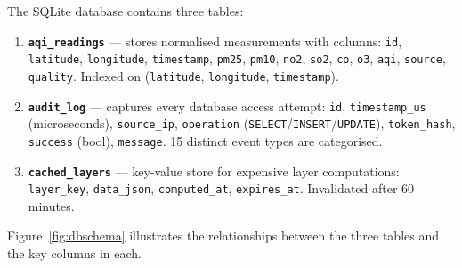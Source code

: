 \documentclass[12pt,a4paper]{article}
\begin{document}
The SQLite database contains three tables:

\begin{enumerate}
\item \textbf{\texttt{aqi\_readings}} --- stores normalised measurements with
      columns: \texttt{id}, \texttt{latitude}, \texttt{longitude},
      \texttt{timestamp}, \texttt{pm25}, \texttt{pm10}, \texttt{no2},
      \texttt{so2}, \texttt{co}, \texttt{o3}, \texttt{aqi}, \texttt{source},
      \texttt{quality}. Indexed on (\texttt{latitude}, \texttt{longitude},
      \texttt{timestamp}).

\item \textbf{\texttt{audit\_log}} --- captures every database access attempt:
      \texttt{id}, \texttt{timestamp\_us} (microseconds), \texttt{source\_ip},
      \texttt{operation} (\texttt{SELECT}/\texttt{INSERT}/\texttt{UPDATE}),
      \texttt{token\_hash}, \texttt{success} (bool), \texttt{message}.
      15 distinct event types are categorised.

\item \textbf{\texttt{cached\_layers}} --- key-value store for expensive
      layer computations: \texttt{layer\_key}, \texttt{data\_json},
      \texttt{computed\_at}, \texttt{expires\_at}. Invalidated after 60 minutes.
\end{enumerate}

Figure~\ref{fig:dbschema} illustrates the relationships between the three
tables and the key columns in each.
\end{document}
